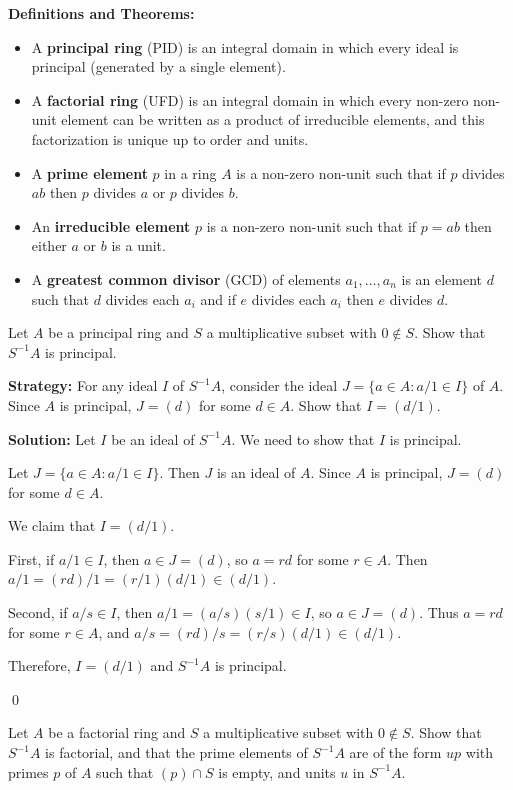 \noindent\textbf{Definitions and Theorems:}
\begin{itemize}
\item A \textbf{principal ring} (PID) is an integral domain in which every ideal is principal (generated by a single element).
\item A \textbf{factorial ring} (UFD) is an integral domain in which every non-zero non-unit element can be written as a product of irreducible elements, and this factorization is unique up to order and units.
\item A \textbf{prime element} $p$ in a ring $A$ is a non-zero non-unit such that if $p$ divides $ab$ then $p$ divides $a$ or $p$ divides $b$.
\item An \textbf{irreducible element} $p$ is a non-zero non-unit such that if $p = ab$ then either $a$ or $b$ is a unit.
\item A \textbf{greatest common divisor} (GCD) of elements $a_1, \ldots, a_n$ is an element $d$ such that $d$ divides each $a_i$ and if $e$ divides each $a_i$ then $e$ divides $d$.
\end{itemize}

\begin{problembox}
Let $A$ be a principal ring and $S$ a multiplicative subset with $0 \notin S$. Show that $S^{-1}A$ is principal.
\end{problembox}

\noindent\textbf{Strategy:} For any ideal $I$ of $S^{-1}A$, consider the ideal $J = \{a \in A : a/1 \in I\}$ of $A$. Since $A$ is principal, $J = (d)$ for some $d \in A$. Show that $I = (d/1)$.

\noindent\textbf{Solution:}
Let $I$ be an ideal of $S^{-1}A$. We need to show that $I$ is principal.

Let $J = \{a \in A : a/1 \in I\}$. Then $J$ is an ideal of $A$. Since $A$ is principal, $J = (d)$ for some $d \in A$.

We claim that $I = (d/1)$. 

First, if $a/1 \in I$, then $a \in J = (d)$, so $a = rd$ for some $r \in A$. Then $a/1 = (rd)/1 = (r/1)(d/1) \in (d/1)$.

Second, if $a/s \in I$, then $a/1 = (a/s)(s/1) \in I$, so $a \in J = (d)$. Thus $a = rd$ for some $r \in A$, and $a/s = (rd)/s = (r/s)(d/1) \in (d/1)$.

Therefore, $I = (d/1)$ and $S^{-1}A$ is principal.


\qed
\begin{problembox}
Let $A$ be a factorial ring and $S$ a multiplicative subset with $0 \notin S$. Show that $S^{-1}A$ is factorial, and that the prime elements of $S^{-1}A$ are of the form $up$ with primes $p$ of $A$ such that $(p) \cap S$ is empty, and units $u$ in $S^{-1}A$.
\end{problembox}

